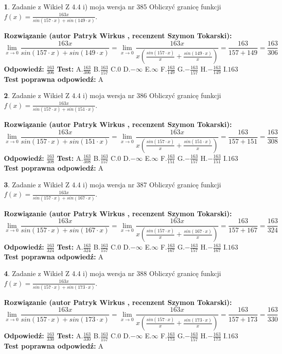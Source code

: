 \documentclass[12pt, a4paper]{article}
\theoremstyle{definition} %
\newtheorem{zad}{}
\newcommand{\zadStart}[1]{\begin{zad}#1\newline}
\newcommand{\zadStop}{\end{zad}}
\newcommand{\rozwStart}[2]{\noindent \textbf{Rozwiązanie (autor #1 , recenzent #2): }\newline}
\newcommand{\rozwStop}{\newline}
\newcommand{\odpStart}{\noindent \textbf{Odpowiedź:}\newline}
\newcommand{\odpStop}{\newline}
\newcommand{\testStart}{\noindent \textbf{Test:}\newline}
\newcommand{\testStop}{\newline}
\newcommand{\kluczStart}{\noindent \textbf{Test poprawna odpowiedź:}\newline}
\newcommand{\kluczStop}{\newline}
\begin{document}
\zadStart{Zadanie z Wikieł Z 4.4 i) moja wersja nr 385}
Obliczyć granicę funkcji $f(x)=\frac{163x}{sin(157\cdot x) +sin(149\cdot x)}$.
\zadStop
\rozwStart{Patryk Wirkus}{Szymon Tokarski}
$$\lim\limits_{x\to 0}\frac{163x}{sin(157\cdot x) +sin(149\cdot x)}=\lim\limits_{x\to 0}\frac{163x}{x(\frac{sin(157\cdot x)}{x}+\frac{sin(149\cdot x)}{x})}=\frac{163}{157+149} = \frac{163}{306}$$
\rozwStop
\odpStart
$\frac{163}{306}$
\odpStop
\testStart
A.$\frac{163}{306}$
B.$\frac{163}{157}$
C.$0$
D.$-\infty$
E.$\infty$
F.$\frac{163}{149}$
G.$-\frac{163}{157}$
H.$-\frac{163}{149}$
I.$163$
\testStop
\kluczStart
A
\kluczStop



\zadStart{Zadanie z Wikieł Z 4.4 i) moja wersja nr 386}
Obliczyć granicę funkcji $f(x)=\frac{163x}{sin(157\cdot x) +sin(151\cdot x)}$.
\zadStop
\rozwStart{Patryk Wirkus}{Szymon Tokarski}
$$\lim\limits_{x\to 0}\frac{163x}{sin(157\cdot x) +sin(151\cdot x)}=\lim\limits_{x\to 0}\frac{163x}{x(\frac{sin(157\cdot x)}{x}+\frac{sin(151\cdot x)}{x})}=\frac{163}{157+151} = \frac{163}{308}$$
\rozwStop
\odpStart
$\frac{163}{308}$
\odpStop
\testStart
A.$\frac{163}{308}$
B.$\frac{163}{157}$
C.$0$
D.$-\infty$
E.$\infty$
F.$\frac{163}{151}$
G.$-\frac{163}{157}$
H.$-\frac{163}{151}$
I.$163$
\testStop
\kluczStart
A
\kluczStop



\zadStart{Zadanie z Wikieł Z 4.4 i) moja wersja nr 387}
Obliczyć granicę funkcji $f(x)=\frac{163x}{sin(157\cdot x) +sin(167\cdot x)}$.
\zadStop
\rozwStart{Patryk Wirkus}{Szymon Tokarski}
$$\lim\limits_{x\to 0}\frac{163x}{sin(157\cdot x) +sin(167\cdot x)}=\lim\limits_{x\to 0}\frac{163x}{x(\frac{sin(157\cdot x)}{x}+\frac{sin(167\cdot x)}{x})}=\frac{163}{157+167} = \frac{163}{324}$$
\rozwStop
\odpStart
$\frac{163}{324}$
\odpStop
\testStart
A.$\frac{163}{324}$
B.$\frac{163}{157}$
C.$0$
D.$-\infty$
E.$\infty$
F.$\frac{163}{167}$
G.$-\frac{163}{157}$
H.$-\frac{163}{167}$
I.$163$
\testStop
\kluczStart
A
\kluczStop



\zadStart{Zadanie z Wikieł Z 4.4 i) moja wersja nr 388}
Obliczyć granicę funkcji $f(x)=\frac{163x}{sin(157\cdot x) +sin(173\cdot x)}$.
\zadStop
\rozwStart{Patryk Wirkus}{Szymon Tokarski}
$$\lim\limits_{x\to 0}\frac{163x}{sin(157\cdot x) +sin(173\cdot x)}=\lim\limits_{x\to 0}\frac{163x}{x(\frac{sin(157\cdot x)}{x}+\frac{sin(173\cdot x)}{x})}=\frac{163}{157+173} = \frac{163}{330}$$
\rozwStop
\odpStart
$\frac{163}{330}$
\odpStop
\testStart
A.$\frac{163}{330}$
B.$\frac{163}{157}$
C.$0$
D.$-\infty$
E.$\infty$
F.$\frac{163}{173}$
G.$-\frac{163}{157}$
H.$-\frac{163}{173}$
I.$163$
\testStop
\kluczStart
A
\kluczStop
\end{document}

